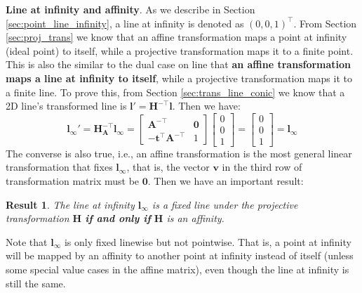 \documentclass[12pt]{article}
\newtheorem{result}{Result}[section]
\numberwithin{equation}{section}
\begin{document}
\textbf{Line at infinity and affinity}. As we describe in Section \ref{sec:point_line_infinity}, a line at infinity is denoted as $(0, 0, 1)^\top$. From Section \ref{sec:proj_trans} we know that an affine transformation maps a point at infinity (ideal point) to itself, while a projective transformation maps it to a finite point. This is also the similar to the dual case on line that \textbf{an affine transformation maps a line at infinity to itself}, while a projective transformation maps it to a finite line. To prove this, from Section \ref{sec:trans_line_conic} we know that a 2D line's transformed line is $\mathbf{l}' = \mathbf{H^{-\top}l}$. Then we have:
\begin{equation*}
\mathbf{l}_{\infty}' = \mathbf{H_A^{-\top}l_{\infty}} = 
\begin{bmatrix}
\mathbf{A}^{-\top} & \mathbf{0} \\
\mathbf{-t^\top A^{-\top}} & 1
\end{bmatrix}
\begin{bmatrix}
0 \\
0 \\
1
\end{bmatrix}
=
\begin{bmatrix}
0 \\
0 \\
1
\end{bmatrix}
=
\mathbf{l}_{\infty}
\end{equation*}
The converse is also true, i.e., an affine transformation is the most general linear transformation that fixes $\mathbf{l}_{\infty}$, that is, the vector $\mathbf{v}$ in the third row of transformation matrix must be $\mathbf{0}$. Then we have an important result: \\

\begin{result}
The line at infinity $\mathbf{l}_{\infty}$ is a fixed line under the projective transformation $\mathbf{H}$ \textbf{if and only if} $\mathbf{H}$ is an affinity.
\label{res:affine_fix_infinity}
\end{result}

Note that $\mathbf{l}_{\infty}$ is only fixed linewise but not pointwise. That is, a point at infinity will be mapped by an affinity to another point at infinity instead of itself (unless some special value cases in the affine matrix), even though the line at infinity is still the same.
\end{document}
